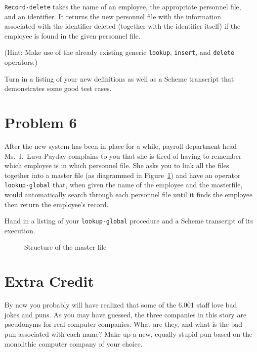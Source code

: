 {\tt Record-delete} takes the name of an employee,
the appropriate personnel file, and an identifier.
It returns the new personnel file with the
information associated with the identifier
deleted (together with the identifier itself)
if the employee is found in the given personnel
file.

(Hint: Make use of the already existing
generic {\tt lookup}, {\tt insert}, and {\tt delete} operators.)

Turn in a listing of your new definitions as well as a {\sc Scheme} transcript
that demonstrates some good test cases.

\section{Problem 6}

After the new system has been in place for a while,  payroll
department head Ms.~I.~Luva Payday complains to
you that she is tired of having to remember which employee is in
which personnel file.  She asks you to link all the files together
into a master file (as diagrammed in Figure~\ref{fig:master-file}) and have an operator
{\tt lookup-global} that, when given the name of the employee and the
masterfile, would automatically search through each personnel file
until it finds the employee then return the employee's record.

Hand in a listing of your {\tt lookup-global} procedure and a
{\sc Scheme} transcript of its execution.

\begin{figure}[ht]
\begin{center}
\mbox{}
\end{center}
\caption{Structure of the master file}\label{fig:master-file}
\end{figure}

\section{Extra Credit}

By now you probably will have realized that some of the 6.001 staff love bad
jokes and puns.  As you may have guessed, the three companies in this story are
pseudonyms for real computer companies.  What are they, and what is the bad pun
associated with each name?  Make up a new, equally stupid pun based on the
monolithic computer company of your choice.

\bigskip
{}
\vspace*{\fill}


